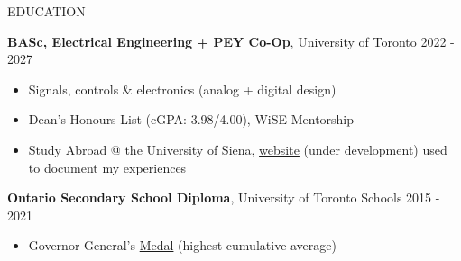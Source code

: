 \documentclass{resume}
\begin{document}

\begin{rSection}{EDUCATION}

   {\bf BASc, Electrical Engineering + PEY Co-Op}, University of Toronto \hfill {2022 - 2027}
   \vspace{-0.2cm}
   \begin{itemize}
    \itemsep -8pt {} 
     \item Signals, controls \& electronics (analog + digital design) 
     \item Dean's Honours List (cGPA: 3.98/4.00), WiSE Mentorship
     \item Study Abroad @ the University of Siena, \href{https://github.com/endothermiic/serendipity}{website} (under development) used to document my experiences 
   \end{itemize}


   {\bf Ontario Secondary School Diploma}, University of Toronto Schools \hfill {2015 - 2021}
   \vspace{-0.2cm}
   \begin{itemize}
    \itemsep -8pt {} 
     \item  Governor General’s \href{https://www.gg.ca/en/honours/recipients/116-110249}{Medal} (highest cumulative average)
   \end{itemize}

\end{rSection}
\end{document}
